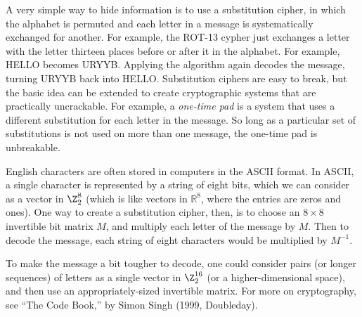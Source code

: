 \begin{remark}  
A very simple way to hide information is to use a substitution cipher, in which the alphabet is permuted and each letter in a message is systematically exchanged for another.  For example, the ROT-13 cypher just exchanges a letter with the letter thirteen places before or after it in the alphabet.  For example, HELLO becomes URYYB.  Applying the algorithm again decodes the message, turning URYYB back into HELLO.  Substitution ciphers are easy to break, but the basic idea can be extended to create cryptographic systems that are practically uncrackable.  For example, a \emph{one-time pad} is a system that uses a different substitution for each letter in the message.  So long as a particular set of substitutions is not used on more than one message, the one-time pad is unbreakable.

English characters are often stored in computers in the ASCII format.  In ASCII, a single character is represented by a string of eight bits, which we can consider as a vector in $\Z_2^8$ (which is like vectors in $\mathbb{R}^8$, where the entries are zeros and ones).  One way to create a substitution cipher, then, is to choose an $8\times 8$ invertible bit matrix $M$, and multiply each letter of the message by $M$.  Then to decode the message, each string of eight characters would be multiplied by $M^{-1}$.  

To make the message a bit tougher to decode, one could consider pairs (or longer sequences) of letters as a single vector in $\Z_2^{16}$ (or a higher-dimensional space), and then use an appropriately-sized invertible matrix.
For more on cryptography, see ``The Code Book,'' by Simon Singh (1999, Doubleday).
\end{remark}

%
%
%
%
